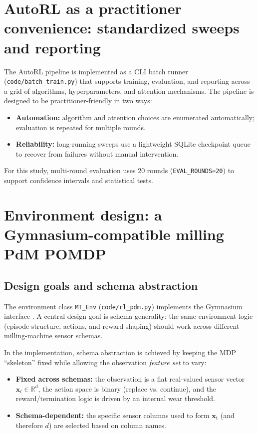 \documentclass[sn-basic]{sn-jnl} %
\begin{document}
\section{AutoRL as a practitioner convenience: standardized sweeps and reporting}
\label{sec:autorl}
The AutoRL pipeline is implemented as a CLI batch runner (\texttt{code/batch\_train.py}) that supports training, evaluation, and reporting across a grid of algorithms, hyperparameters, and attention mechanisms. The pipeline is designed to be practitioner-friendly in two ways:
\begin{itemize}
        \item \textbf{Automation:} algorithm and attention choices are enumerated automatically; evaluation is repeated for multiple rounds.
        \item \textbf{Reliability:} long-running sweeps use a lightweight SQLite checkpoint queue to recover from failures without manual intervention.
\end{itemize}
For this study, multi-round evaluation uses 20 rounds (\texttt{EVAL\_ROUNDS=20}) to support confidence intervals and statistical tests.

\section{Environment design: a Gymnasium-compatible milling PdM POMDP}
\label{sec:env}
\subsection{Design goals and schema abstraction}
The environment class \texttt{MT\_Env} (\texttt{code/rl\_pdm.py}) implements the Gymnasium interface \cite{Foundation2023}. A central design goal is schema generality: the same environment logic (episode structure, actions, and reward shaping) should work across different milling-machine sensor schemas.

In the implementation, schema abstraction is achieved by keeping the MDP ``skeleton'' fixed while allowing the observation \emph{feature set} to vary:
\begin{itemize}
        \item \textbf{Fixed across schemas:} the observation is a flat real-valued sensor vector $\mathbf{x}_t\in\mathbb{R}^d$, the action space is binary (replace vs. continue), and the reward/termination logic is driven by an internal wear threshold.
        \item \textbf{Schema-dependent:} the specific sensor columns used to form $\mathbf{x}_t$ (and therefore $d$) are selected based on column names.
\end{itemize}
\end{document}
